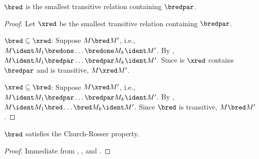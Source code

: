 \documentclass[../../../include/open-logic-section]{subfiles}
\begin{document}
\begin{lem}
  $\bred$ is the smallest transitive relation containing $\bredpar$.
\end{lem}

\begin{proof}
  Let $\xred$ be the smallest transitive relation containing
  $\bredpar$.

  $\bred \subseteq \xred$: Suppose $M \bred M'$, i.e., $M \ident M_1
  \bredone \dots \bredone M_k \ident M'$. By , $M
  \ident M_1 \bredpar \dots \bredpar M_k \ident M'$. Since is $\xred$
  contains $\bredpar$ and is transitive, $M \xred M'$.

  $\xred \subseteq \bred$: Suppose $M \xred M'$, i.e., $M
  \ident M_1 \bredpar \dots \bredpar M_k \ident M'$. By , $M \ident M_1
  \bred \dots \bred M_k \ident M'$. Since $\bred$ is transitive, $M
  \bred M'$.
\end{proof}

\begin{thm}
  $\bred$ satisfies the Church-Rosser property.
\end{thm}

\begin{proof}
  Immediate from , , and .
\end{proof}
\end{document}
